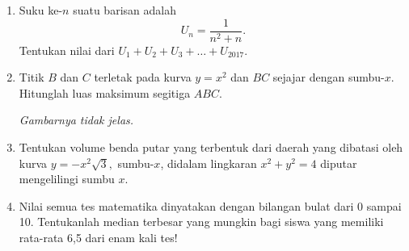 \begin{enumerate}
\item Suku ke-$n$ suatu barisan adalah \[U_n = \frac{1}{n^2+n}.\] Tentukan nilai dari $U_1 + U_2 + U_3 +\ldots + U_{2017}$.

\item Titik $B$ dan $C$ terletak pada kurva $y=x^2$ dan $BC$ sejajar dengan sumbu-$x$. Hitunglah luas maksimum segitiga $ABC$. \par \emph{Gambarnya tidak jelas.}

\item Tentukan volume benda putar yang terbentuk dari daerah yang dibatasi oleh kurva $y=-x^2\sqrt{3},$ sumbu-$x$, didalam lingkaran $x^2+y^2=4$ diputar mengelilingi sumbu $x$.

\item Nilai semua tes matematika dinyatakan dengan bilangan bulat dari 0 sampai 10. Tentukanlah median terbesar yang mungkin bagi siswa yang memiliki rata-rata 6,5 dari enam kali tes!

\end{enumerate}